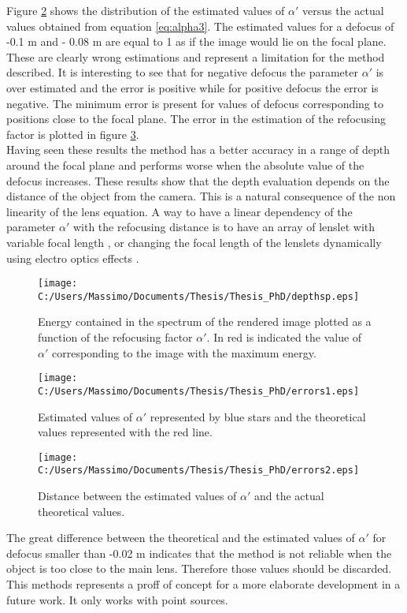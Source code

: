 Figure \ref{fig:error} shows the distribution of the estimated values of $ \alpha'$ versus the actual values obtained from equation \ref{eq:alpha3}.
 The estimated values for a defocus of -0.1 m and - 0.08 m are equal to 1 as if the image would lie on the focal plane. These are clearly wrong estimations and represent a limitation for the method described. It is interesting to see that for negative defocus the parameter $ \alpha'$ is over estimated and the error is positive while for positive defocus the error is negative. The minimum error is present for values of defocus corresponding to positions close to the focal plane. The error in the estimation of the refocusing factor is plotted in figure \ref{fig:error1}.
 \\
 Having seen these results the method has a better accuracy in a range of depth around the focal plane and performs worse when the absolute value of the defocus increases.
 These results show that the depth evaluation depends on the distance of the object from the camera. This is a natural consequence of the non linearity of the lens equation. A way to have a linear dependency of the parameter $ \alpha'$ with the refocusing distance is to have an array of lenslet with variable focal length \cite{wetzstein2011computational,georgiev2012multifocus}, or changing the focal length of the lenslets dynamically using electro optics effects \cite{ueda2008multi}.
 \begin{figure}[H]
 	\centering
 	\texttt{[image: C:/Users/Massimo/Documents/Thesis/Thesis\_PhD/depthsp.eps]}
 	\caption{\label{fig:maxima} Energy contained in the spectrum of the rendered image plotted as a function of the refocusing factor $ \alpha'$. In red is indicated the value of $ \alpha'$ corresponding to the image with the maximum energy. }
 \end{figure}
\begin{figure}[H]
	\centering
	\texttt{[image: C:/Users/Massimo/Documents/Thesis/Thesis\_PhD/errors1.eps]}
	\caption{\label{fig:error} Estimated values of $ \alpha'$ represented by blue stars and the theoretical values represented with the red line. }
\end{figure}
\begin{figure}[H]
	\centering
	\texttt{[image: C:/Users/Massimo/Documents/Thesis/Thesis\_PhD/errors2.eps]}
	\caption{\label{fig:error1} Distance between the estimated values of $ \alpha'$ and the actual theoretical values. }
\end{figure}
The great difference between the theoretical and the estimated values of $\alpha'$ for defocus smaller than -0.02 m indicates that the method is not reliable when the object is too close to the main lens. Therefore those values should be discarded. This methods represents a proff of concept for a more elaborate development in a future work. It only works with point sources.
